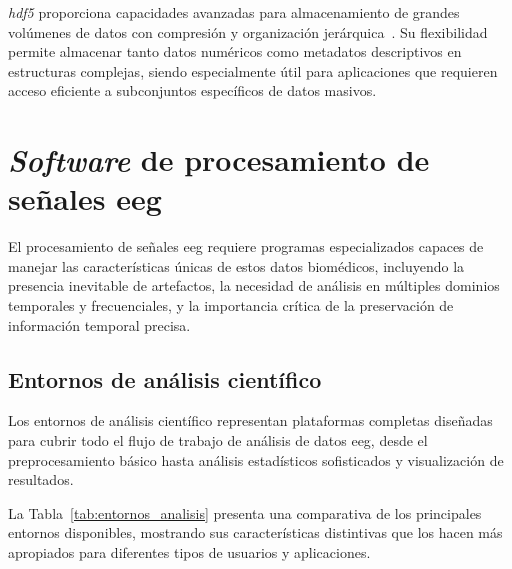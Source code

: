 \textit{\acrfull{hdf5}} proporciona capacidades avanzadas para almacenamiento de grandes volúmenes de datos con compresión y organización jerárquica~\cite{folk2011overview}. Su flexibilidad permite almacenar tanto datos numéricos como metadatos descriptivos en estructuras complejas, siendo especialmente útil para aplicaciones que requieren acceso eficiente a subconjuntos específicos de datos masivos.

\section{\textit{Software} de procesamiento de señales \acrshort{eeg}}
\label{sec:software_procesamiento}

El procesamiento de señales \acrshort{eeg} requiere programas especializados capaces de manejar las características únicas de estos datos biomédicos, incluyendo la presencia inevitable de \glspl{artefacto}, la necesidad de análisis en múltiples dominios temporales y frecuenciales, y la importancia crítica de la preservación de información temporal precisa.

\subsection{Entornos de análisis científico}
\label{subsec:entornos_analisis}

Los entornos de análisis científico representan plataformas completas diseñadas para cubrir todo el flujo de trabajo de análisis de datos \acrshort{eeg}, desde el preprocesamiento básico hasta análisis estadísticos sofisticados y visualización de resultados.

La Tabla~\ref{tab:entornos_analisis} presenta una comparativa de los principales entornos disponibles, mostrando sus características distintivas que los hacen más apropiados para diferentes tipos de usuarios y aplicaciones.

\begin{table}[h!]
\centering
{}
\caption{Comparativa de entornos de análisis científico \acrshort{eeg}}
\label{tab:entornos_analisis}
\end{table}

